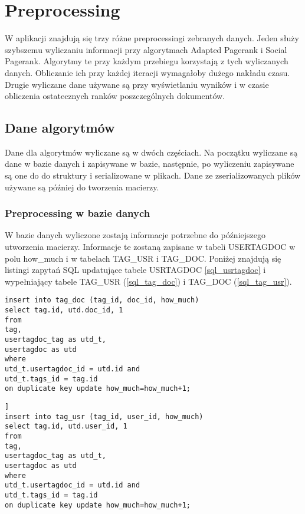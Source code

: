 \documentclass[11pt,a4paper]{report}
\begin{document}
\tableofcontents
\listofprograms
\listoflistings
\chapter{Preprocessing}

W aplikacji znajdują się trzy różne preprocessingi zebranych danych. Jeden służy szybszemu wyliczaniu informacji przy algorytmach Adapted Pagerank i Social Pagerank. Algorytmy te przy każdym przebiegu korzystają z tych wyliczanych danych. Obliczanie ich przy każdej iteracji wymagałoby dużego nakładu czasu. Drugie wyliczane dane używane są przy wyświetlaniu wyników i w czasie obliczenia ostatecznych ranków  poszczególnych dokumentów.

\section{Dane algorytmów}

Dane dla algorytmów wyliczane są w dwóch częściach. Na początku wyliczane są dane w bazie danych i zapisywane w bazie, następnie, po wyliczeniu zapisywane są one do do struktury i serializowane w plikach. Dane ze zserializowanych plików używane są później do tworzenia macierzy.

\subsection{Preprocessing w bazie danych}

W bazie danych wyliczone zostają informacje potrzebne do późniejszego utworzenia macierzy. Informacje te zostaną zapisane w tabeli USERTAGDOC w polu how\_much i w tabelach TAG\_USR i TAG\_DOC. Poniżej znajdują się listingi zapytań SQL updatujące tabele USRTAGDOC \ref{sql_usrtagdoc} i wypełniający tabele TAG\_USR (\ref{sql_tag_doc}) i TAG\_DOC (\ref{sql_tag_usr}). 






\lstset{language=SQL}   
\begin{lstlisting}[frame=lines, caption={Skrypt dodający dane do tabeli tag\_doc}, label={sql_tag_doc}]
insert into tag_doc (tag_id, doc_id, how_much)
select tag.id, utd.doc_id, 1
from
tag,
usertagdoc_tag as utd_t,
usertagdoc as utd
where
utd_t.usertagdoc_id = utd.id and
utd_t.tags_id = tag.id
on duplicate key update how_much=how_much+1;
\end{lstlisting}

\begin{lstlisting}[frame=lines, caption={Skrypt dodający dane do tabeli tag\_usr}, label={sql_tag_usr}]]
insert into tag_usr (tag_id, user_id, how_much)
select tag.id, utd.user_id, 1
from
tag,
usertagdoc_tag as utd_t,
usertagdoc as utd
where
utd_t.usertagdoc_id = utd.id and
utd_t.tags_id = tag.id
on duplicate key update how_much=how_much+1;
\end{lstlisting}
\end{document}
